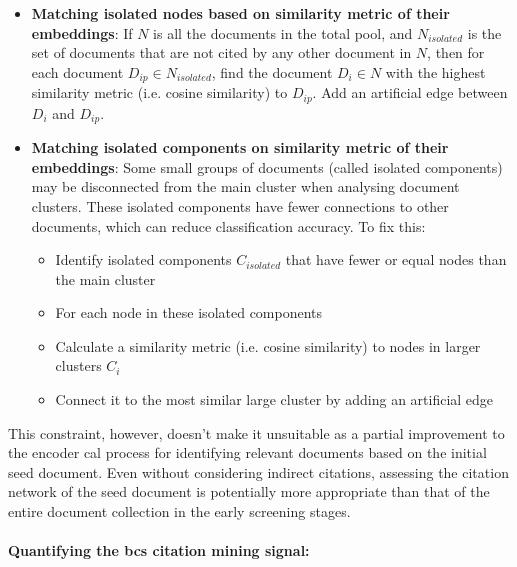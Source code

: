 \documentclass[10pt,oneside]{book}
\begin{document}
\begin{itemize}
    \item \textbf{Matching isolated nodes based on similarity metric of their embeddings}: If $N$ is all the documents in the total pool, and $N_{isolated}$ is the set of documents that are not cited by any other document in $N$, then for each document $D_{ip} \in N_{isolated}$, find the document $D_i \in N$ with the highest similarity metric (i.e. cosine similarity) to $D_{ip}$. Add an artificial edge between $D_i$ and $D_{ip}$.
    \item \textbf{Matching isolated components on similarity metric of their embeddings}: Some small groups of documents (called isolated components) may be disconnected from the main cluster when analysing document clusters. These isolated components have fewer connections to other documents, which can reduce classification accuracy. To fix this:
    \begin{itemize}
        \item Identify isolated components $C_{isolated}$ that have fewer or equal nodes than the main cluster
        \item For each node in these isolated components
        \item Calculate a similarity metric (i.e. cosine similarity) to nodes in larger clusters $C_i$
        \item Connect it to the most similar large cluster by adding an artificial edge
    \end{itemize}

\end{itemize}

This constraint, however, doesn't make it unsuitable as a partial improvement to the encoder \gls*{cal} process for identifying relevant documents based on the initial seed document. Even without considering indirect citations, assessing the citation network of the seed document is potentially more appropriate than that of the entire document collection in the early screening stages.

\paragraph{Quantifying the \gls*{bcs} citation mining signal: }
\end{document}
